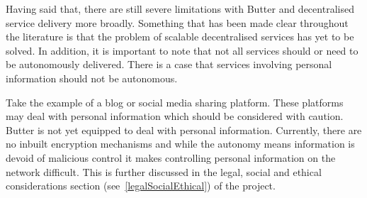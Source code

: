 Having said that, there are still severe limitations with Butter and decentralised service delivery more broadly. Something that has been made clear throughout the literature is that the problem of scalable decentralised services has yet to be solved. In addition, it is important to note that not all services should or need to be autonomously delivered. There is a case that services involving personal information should not be autonomous.

Take the example of a blog or social media sharing platform. These platforms may deal with personal information which should be considered with caution. Butter is not yet equipped to deal with personal information. Currently, there are no inbuilt encryption mechanisms and while the autonomy means information is devoid of malicious control it makes controlling personal information on the network difficult. This is further discussed in the legal, social and ethical considerations section (see~\ref{legalSocialEthical}) of the project.



